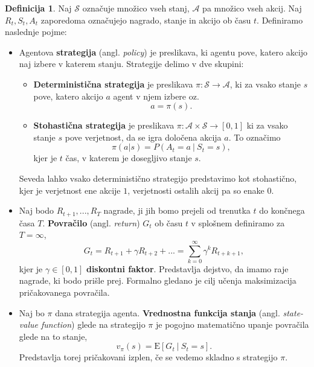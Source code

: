 \documentclass[12pt,a4paper]{amsart}
\theoremstyle{definition} %
\newtheorem{definicija}{Definicija}[section]
\theoremstyle{plain} %
\begin{document}
\begin{definicija}
    Naj $\mathcal{S}$ označuje množico vseh stanj, $\mathcal{A}$ pa množico vseh akcij. Naj $R_t,
    S_t, A_t$ zaporedoma označujejo nagrado, stanje in akcijo ob času $t$. Definiramo naslednje 
    pojme: 
    \begin{itemize}
        \item   Agentova \textbf{strategija} (angl. \textit{policy}) je preslikava, ki agentu pove, 
                katero akcijo naj izbere v katerem stanju. Strategije delimo v dve skupini:
                \begin{itemize}
                    \item \textbf{Deterministična strategija} je preslikava $\pi: \mathcal{S} 
                    \rightarrow \mathcal{A}$, ki za vsako stanje $s$ pove, katero akcijo $a$ agent v njem 
                    izbere oz.
                    $$
                    a = \pi(s).
                    $$
                    \item \textbf{Stohastična strategija} je preslikava $\pi: \mathcal{A} \times 
                    \mathcal{S} \rightarrow [0, 1]$ ki za vsako stanje $s$ pove verjetnost, da se igra 
                    določena akcija $a$. To označimo 
                    $$
                    \pi(a | s) = P(A_t = a~|~S_t = s),
                    $$
                    kjer je $t$ čas, v katerem je dosegljivo stanje $s$.
                \end{itemize}
                Seveda lahko vsako deterministično strategijo predstavimo kot stohastično, kjer je 
                verjetnost ene akcije $1$, verjetnosti ostalih akcij pa so enake $0$.
        
        \item Naj bodo $R_{t+1}, ...,R_T$ nagrade, ji jih bomo prejeli od trenutka 
                $t$ do končnega časa $T$. \textbf{Povračilo} (angl. \textit{return}) $G_t$ ob času $t$ 
                v splošnem definiramo za $T=\infty$,
                $$
                G_t = R_{t+1} + \gamma R_{t+2} + ... = \sum_{k=0}^\infty \gamma^k R_{t + k + 1} ,
                $$
                kjer je $\gamma \in [0,1]$ \textbf{diskontni faktor}. Predstavlja dejstvo, da 
                imamo raje nagrade, ki bodo prišle prej. Formalno gledano je cilj učenja 
                maksimizacija pričakovanega povračila.

         \item Naj bo $\pi$ dana strategija agenta. \textbf{Vrednostna funkcija 
                stanja} (angl. \textit{state-value function}) glede na strategijo $\pi$ je 
                pogojno matematično upanje povračila glede na to stanje, 
                \begin{equation}\label{vfs}
                v_\pi(s) = \mathrm{E} [G_t~|~S_t = s].
                \end{equation}
                Predstavlja torej pričakovani izplen, če se vedemo skladno s strategijo $\pi$.


\end{itemize}
\end{definicija}
\end{document}
